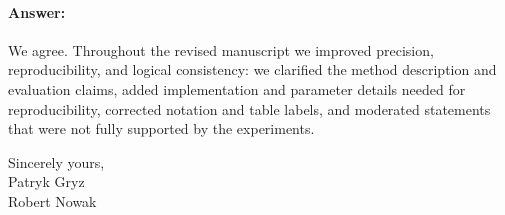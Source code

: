 \documentclass{article}
\begin{document}
\paragraph{Answer:}
We agree.
Throughout the revised manuscript we improved precision, reproducibility, and logical consistency: we clarified the method description and evaluation claims, added implementation and parameter details needed for reproducibility, corrected notation and table labels, and moderated statements that were not fully supported by the experiments.


\vspace{0.25in}

Sincerely yours,\\
Patryk Gryz\\
Robert Nowak\\
\end{document}
